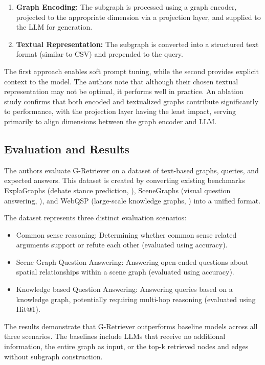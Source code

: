 \begin{enumerate}
    \item \textbf{Graph Encoding:} The subgraph is processed using a graph encoder, projected to the appropriate dimension via a projection layer, and supplied to the LLM for generation.
    \item \textbf{Textual Representation:} The subgraph is converted into a structured text format (similar to CSV) and prepended to the query.
\end{enumerate}

The first approach enables soft prompt tuning, while the second provides explicit context to the model.
The authors note that although their chosen textual representation may not be optimal, it performs well in practice.
An ablation study confirms that both encoded and textualized graphs contribute significantly to performance, with the projection layer having the least impact, serving primarily to align dimensions between the graph encoder and LLM.

\subsection{Evaluation and Results}

The authors evaluate G-Retriever on a dataset of text-based graphs, queries, and expected answers.
This dataset is created by converting existing benchmarks \textemdash ExplaGraphs (debate stance prediction, \cite{explagraphs}), SceneGraphs (visual question answering, \cite{scenegraphs}), and WebQSP (large-scale knowledge graphs, \cite{webqsp}) \textemdash into a unified format.

The dataset represents three distinct evaluation scenarios:

\begin{itemize}

    \item Common sense reasoning: Determining whether common sense related arguments support or refute each other (evaluated using accuracy).
    \item Scene Graph Question Answering: Answering open-ended questions about spatial relationships within a scene graph (evaluated using accuracy).
    \item Knowledge based Question Answering: Answering queries based on a knowledge graph, potentially requiring multi-hop reasoning (evaluated using Hit@1).
\end{itemize}

The results demonstrate that G-Retriever outperforms baseline models across all three scenarios. The baselines include LLMs that receive no additional information, the entire graph as input, or the top-k retrieved nodes and edges without subgraph construction.

